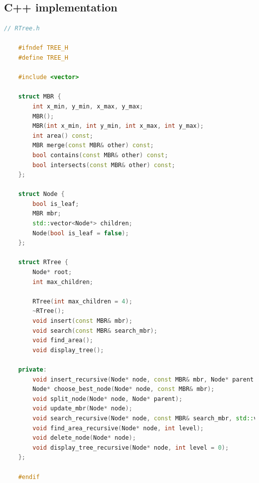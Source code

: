 \documentclass{article}
\begin{document}
\subsection{C++ implementation}
\begin{lstlisting}[language=c++]
	// RTree.h

	#ifndef TREE_H
	#define TREE_H

	#include <vector>

	struct MBR {
		int x_min, y_min, x_max, y_max;
		MBR();
		MBR(int x_min, int y_min, int x_max, int y_max);
		int area() const;
		MBR merge(const MBR& other) const;
		bool contains(const MBR& other) const;
		bool intersects(const MBR& other) const;
	};

	struct Node {
		bool is_leaf;
		MBR mbr;
		std::vector<Node*> children;
		Node(bool is_leaf = false);
	};

	struct RTree {
		Node* root;
		int max_children;

		RTree(int max_children = 4);
		~RTree();
		void insert(const MBR& mbr);
		void search(const MBR& search_mbr);
		void find_area();
		void display_tree();

	private:
		void insert_recursive(Node* node, const MBR& mbr, Node* parent = nullptr);
		Node* choose_best_node(Node* node, const MBR& mbr);
		void split_node(Node* node, Node* parent);
		void update_mbr(Node* node);
		void search_recursive(Node* node, const MBR& search_mbr, std::vector<Node*>& results);
		void find_area_recursive(Node* node, int level);
		void delete_node(Node* node);
		void display_tree_recursive(Node* node, int level = 0);
	};

	#endif
\end{lstlisting}
\end{document}
